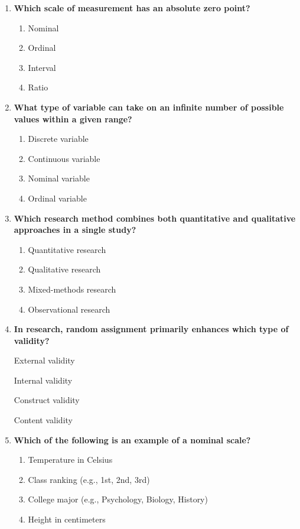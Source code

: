 \documentclass[
  letterpaper,
  DIV=11,
  numbers=noendperiod]{scrreprt}
\begin{document}
\begin{enumerate}
\def\labelenumi{\arabic{enumi}.}
\item
  \textbf{Which scale of measurement has an absolute zero point?}

  \begin{enumerate}
  \def\labelenumii{\alph{enumii}.}
  \item
    Nominal
  \item
    Ordinal
  \item
    Interval
  \item
    Ratio
  \end{enumerate}
\item
  \textbf{What type of variable can take on an infinite number of
  possible values within a given range?}

  \begin{enumerate}
  \def\labelenumii{\alph{enumii}.}
  \item
    Discrete variable
  \item
    Continuous variable
  \item
    Nominal variable
  \item
    Ordinal variable
  \end{enumerate}
\item
  \textbf{Which research method combines both quantitative and
  qualitative approaches in a single study?}

  \begin{enumerate}
  \def\labelenumii{\alph{enumii}.}
  \item
    Quantitative research
  \item
    Qualitative research
  \item
    Mixed-methods research
  \item
    Observational research
  \end{enumerate}
\item
  \textbf{In research, random assignment primarily enhances which type
  of validity?}

  External validity

  Internal validity

  Construct validity

  Content validity
\item
  \textbf{Which of the following is an example of a nominal scale?}

  \begin{enumerate}
  \def\labelenumii{\alph{enumii}.}
  \item
    Temperature in Celsius
  \item
    Class ranking (e.g., 1st, 2nd, 3rd)
  \item
    College major (e.g., Psychology, Biology, History)
  \item
    Height in centimeters
  \end{enumerate}
\end{enumerate}
\end{document}
